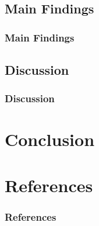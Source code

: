 \documentclass[11pt, aspectratio=1610, xcolor={dvipsnames}]{beamer}
\begin{document}
	\subsection{Main Findings}
	\begin{frame}
		\frametitle{Main Findings}
	\end{frame}
	
	\subsection{Discussion}
	\begin{frame}
		\frametitle{Discussion}
	\end{frame}
	
	\section{Conclusion}
	\begin{frame}
		\frametitle{}
	\end{frame}
	
	\section*{References}
	\begin{frame}[allowframebreaks]
		\frametitle{References}
		
		
		
	\end{frame}
	
\end{document}
